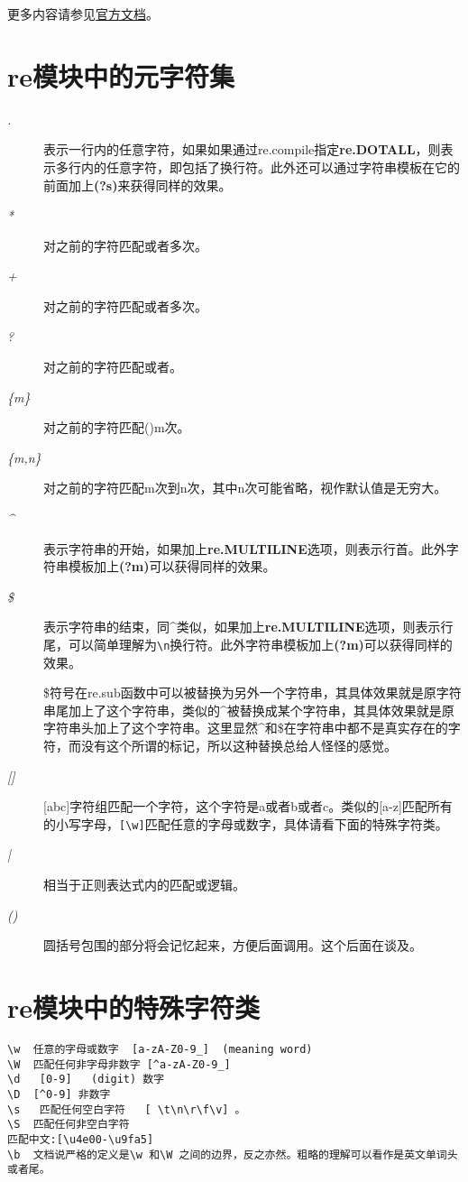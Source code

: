 \documentclass[12pt,oneside]{book}
\begin{document}
\begin{common-format}
\begin{large}
更多内容请参见\href{https://docs.python.org/3/library/re.html}{官方文档}。
\end{large}

\section{re模块中的元字符集}
\begin{description}
\item[\emph{.}] 表示一行内的任意字符，如果如果通过re.compile指定\textbf{re.DOTALL}，则表示多行内的任意字符，即包括了换行符。此外还可以通过字符串模板在它的前面加上\textbf{(?s)}来获得同样的效果。
\item[\emph{*}] 对之前的字符匹配或者多次。
\item[\emph{+}] 对之前的字符匹配或者多次。
\item[\emph{?}] 对之前的字符匹配或者。
\item[\emph{\{m\}}] 对之前的字符匹配()m次。
\item[\emph{\{m,n\}}] 对之前的字符匹配m次到n次，其中n次可能省略，视作默认值是无穷大。
\item[\emph{\^{}}] 表示字符串的开始，如果加上\textbf{re.MULTILINE}选项，则表示行首。此外字符串模板加上\textbf{(?m)}可以获得同样的效果。
\item[\emph{\${}}] 表示字符串的结束，同\^{}类似，如果加上\textbf{re.MULTILINE}选项，则表示行尾，可以简单理解为\verb+\n+换行符。此外字符串模板加上\textbf{(?m)}可以获得同样的效果。

\${}符号在re.sub函数中可以被替换为另外一个字符串，其具体效果就是原字符串尾加上了这个字符串，类似的\^{}被替换成某个字符串，其具体效果就是原字符串头加上了这个字符串。这里显然\^{}和\${}在字符串中都不是真实存在的字符，而没有这个所谓的标记，所以这种替换总给人怪怪的感觉。
\item[\emph{[]}] [abc]字符组匹配一个字符，这个字符是a或者b或者c。类似的[a-z]匹配所有的小写字母，\verb+[\w]+匹配任意的字母或数字，具体请看下面的特殊字符类。
\item[\emph{|}] 相当于正则表达式内的匹配或逻辑。
\item[\emph{()}] 圆括号包围的部分将会记忆起来，方便后面调用。这个后面在谈及。
\end{description}



\section{re模块中的特殊字符类}
\begin{Verbatim}
\w  任意的字母或数字  [a-zA-Z0-9_]  (meaning word)
\W  匹配任何非字母非数字 [^a-zA-Z0-9_]
\d   [0-9]   (digit) 数字
\D  [^0-9] 非数字
\s   匹配任何空白字符   [ \t\n\r\f\v] 。
\S  匹配任何非空白字符
匹配中文:[\u4e00-\u9fa5]
\b  文档说严格的定义是\w 和\W 之间的边界，反之亦然。粗略的理解可以看作是英文单词头或者尾。
\end{Verbatim}


\end{common-format}
\end{document}
